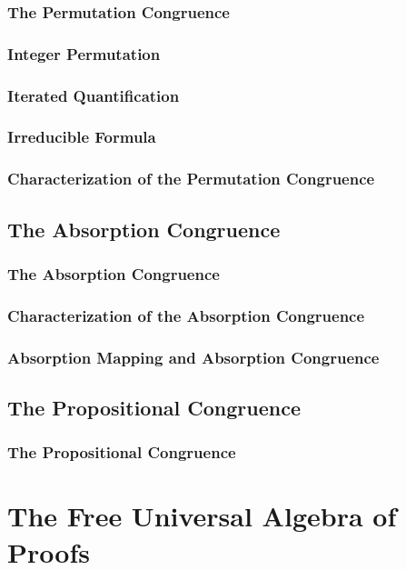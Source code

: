 \documentclass{report}
\begin{document}
    \subsection{The Permutation Congruence}
      
    \subsection{Integer Permutation}
      
    \subsection{Iterated Quantification}
      
    \subsection{Irreducible Formula}
      
    \subsection{Characterization of the Permutation Congruence}
      
\section{The Absorption Congruence}
    \subsection{The Absorption Congruence}
      
    \subsection{Characterization of the Absorption Congruence}
      
    \subsection{Absorption Mapping and Absorption Congruence}
      
\section{The Propositional Congruence}
    \subsection{The Propositional Congruence}
      
\chapter{The Free Universal Algebra of Proofs}
\end{document}
